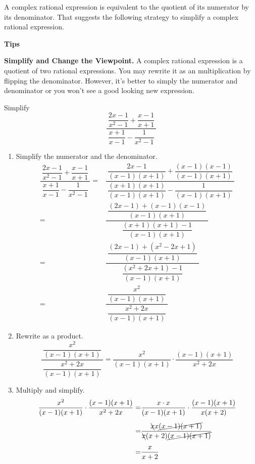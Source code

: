 \documentclass[en,12pt]{elegantbook}
\providecommand{\tightlist}{%
  \setlength{\itemsep}{0pt}\setlength{\parskip}{0pt}}
\newenvironment{rmdtip}{
	\par\noindent
	{
		\makebox[-\width][r]{
			\footnotesize\color{red!90}
            \HandRight
			\hspace*{1pt}
		}
			\textbf{
				\color{second}
				\hspace*{3pt}
				Tips 
			}
    }
    \begin{shaded}
    \sffamily
}{
    \par\medskip\ignorespacesafterend
    \end{shaded}
}
\providecommand{\tightlist}{%
  \setlength{\itemsep}{0pt}\setlength{\parskip}{0pt}}
\let\BeginKnitrBlock\begin \let\EndKnitrBlock\end
\begin{document}
A complex rational expression is equivalent to the quotient of its numerator by its denominator. That suggests the following strategy to simplify a complex rational expression.

\begin{rmdtip}

\textbf{Simplify and Change the Viewpoint.} A complex rational expression is a quotient of two rational expressions. You may rewrite it as an multiplication by flipping the denominator. However, it's better to simply the numerator and denominator or you won't see a good looking new expression.

\end{rmdtip}

\BeginKnitrBlock{example}
\protect\hypertarget{exm:unnamed-chunk-50}{}{\label{exm:unnamed-chunk-50} }
Simplify
\[
\dfrac{~\dfrac{2x-1}{x^2-1}+\dfrac{x-1}{x+1}~}{~\dfrac{x+1}{x-1}-\dfrac{1}{x^2-1}~}
\]
\EndKnitrBlock{example}

\BeginKnitrBlock{solution}


\begin{enumerate}
\def\labelenumi{\arabic{enumi}.}
\tightlist
\item
  Simplify the numerator and the denominator.
  \[
       \begin{aligned}
           \dfrac{~\dfrac{2x-1}{x^2-1}+\dfrac{x-1}{x+1}~}{~\dfrac{x+1}{x-1}-\dfrac{1}{x^2-1}~}
           =&\dfrac{
               ~\dfrac{2x-1}{(x-1)(x+1)}+\dfrac{(x-1)(x-1)}{(x-1)(x+1)}~
           }{~
               \dfrac{(x+1)(x+1)}{(x-1)(x+1)}-\dfrac{1}{(x-1)(x+1)}~
           }\\[5pt]
           =&\dfrac{
               ~\dfrac{(2x-1)+(x-1)(x-1)}{(x-1)(x+1)}~
           }{
               ~\dfrac{(x+1)(x+1)-1}{(x-1)(x+1)}~
           }\\[5pt]
           =&\dfrac{
               ~\dfrac{(2x-1)+(x^2-2x+1)}{(x-1)(x+1)}~
           }{
               ~\dfrac{(x^2+2x+1)-1}{(x-1)(x+1)}~
           }\\[5pt]
           =&\dfrac{
               ~\dfrac{x^2}{(x-1)(x+1)}~
           }{
               ~\dfrac{x^2+2x}{(x-1)(x+1)}~
           }
       \end{aligned}
   \]
\item
  Rewrite as a product.
  \[
       \dfrac{
           ~\dfrac{x^2}{(x-1)(x+1)}~
       }{
           ~\dfrac{x^2+2x}{(x-1)(x+1)}~
       }
       =\dfrac{x^2}{(x-1)(x+1)}\cdot \dfrac{(x-1)(x+1)}{x^2+2x}
   \]
\item
  Multiply and simplify.
  \[
       \begin{aligned}
       \dfrac{x^2}{(x-1)(x+1)}\cdot \dfrac{(x-1)(x+1)}{x^2+2x}
       =&\dfrac{x\cdot x}{(x-1)(x+1)}\cdot \dfrac{(x-1)(x+1)}{x(x+2)}\\[5pt]
       =& \dfrac{\bcancel{x}x\cancel{(x-1)(x+1)}}{\bcancel{x}(x+2)\cancel{(x-1)(x+1)}}\\[5pt]
       =& \dfrac{x}{x+2}
       \end{aligned}
   \]
\end{enumerate}
\EndKnitrBlock{solution}
\end{document}
